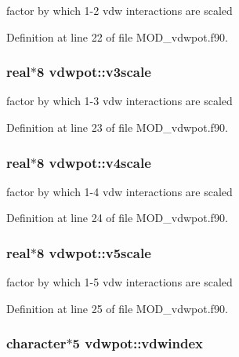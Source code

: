 factor by which 1-\/2 vdw interactions are scaled 



Definition at line 22 of file M\-O\-D\-\_\-vdwpot.\-f90.

\hypertarget{classvdwpot_aaa31f7b4139ddd393d12932d89e63c32}{
\subsubsection[{v3scale}]{\setlength{\rightskip}{0pt plus 5cm}real$\ast$8 vdwpot\-::v3scale}}\label{classvdwpot_aaa31f7b4139ddd393d12932d89e63c32}


factor by which 1-\/3 vdw interactions are scaled 



Definition at line 23 of file M\-O\-D\-\_\-vdwpot.\-f90.

\hypertarget{classvdwpot_aa8a0d70d0b0a4d7aca0f8ac9fc33e62d}{
\subsubsection[{v4scale}]{\setlength{\rightskip}{0pt plus 5cm}real$\ast$8 vdwpot\-::v4scale}}\label{classvdwpot_aa8a0d70d0b0a4d7aca0f8ac9fc33e62d}


factor by which 1-\/4 vdw interactions are scaled 



Definition at line 24 of file M\-O\-D\-\_\-vdwpot.\-f90.

\hypertarget{classvdwpot_a7c49d57b6764a554052c00b221c88640}{
\subsubsection[{v5scale}]{\setlength{\rightskip}{0pt plus 5cm}real$\ast$8 vdwpot\-::v5scale}}\label{classvdwpot_a7c49d57b6764a554052c00b221c88640}


factor by which 1-\/5 vdw interactions are scaled 



Definition at line 25 of file M\-O\-D\-\_\-vdwpot.\-f90.

\hypertarget{classvdwpot_a82c07ae824098ad7dcab3a4b36470f4c}{
\subsubsection[{vdwindex}]{\setlength{\rightskip}{0pt plus 5cm}character$\ast$5 vdwpot\-::vdwindex}}\label{classvdwpot_a82c07ae824098ad7dcab3a4b36470f4c}


